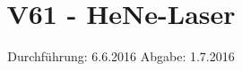


\subject{Versuchsprotokoll}
\title{V61 - HeNe-Laser}
\date{
  Durchführung: 6.6.2016
  \hspace{3em}
  Abgabe: 1.7.2016
}




\maketitle
\thispagestyle{empty}







\printbibliography


